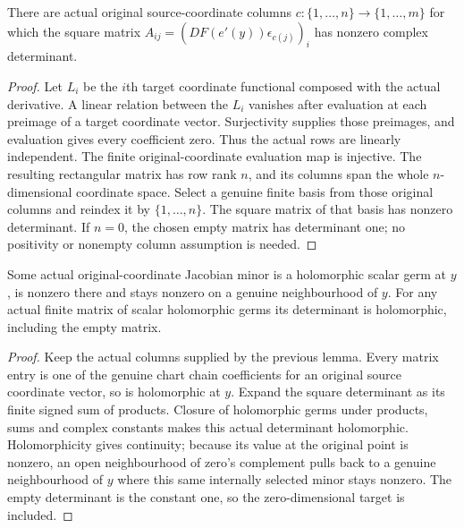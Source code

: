 \begin{lemma}\label{hir:submersion-jacobian-nonzero-minor}
There are actual original source-coordinate columns
$c:\{1,\ldots,n\}\to\{1,\ldots,m\}$ for which the square matrix
$A_{ij}=(DF(e'(y))\epsilon_{c(j)})_i$ has nonzero complex determinant.
\leanok
{}
\end{lemma}
\begin{proof}
Let $L_i$ be the $i$th target coordinate functional composed with the actual
derivative. A linear relation between the $L_i$ vanishes after evaluation at
each preimage of a target coordinate vector. Surjectivity supplies those
preimages, and evaluation gives every coefficient zero. Thus the actual rows
are linearly independent. The finite original-coordinate evaluation map is
injective. The resulting rectangular matrix has row rank $n$, and its columns
span the whole $n$-dimensional coordinate space. Select a genuine finite basis
from those original columns and reindex it by $\{1,\ldots,n\}$. The square
matrix of that basis has nonzero determinant. If $n=0$, the chosen empty matrix
has determinant one; no positivity or nonempty column assumption is needed.
\end{proof}

\begin{theorem}\label{hir:submersion-holomorphic-jacobian-pivot}
Some actual original-coordinate Jacobian minor is a holomorphic scalar germ
at $y$, is nonzero there and stays nonzero on a genuine neighbourhood of $y$.
For any actual finite matrix of scalar holomorphic germs its determinant is
holomorphic, including the empty matrix.
\leanok
{}
\end{theorem}
\begin{proof}
Keep the actual columns supplied by the previous lemma. Every matrix entry is
one of the genuine chart chain coefficients for an original source coordinate
vector, so is holomorphic at $y$. Expand the square determinant as its finite
signed sum of products. Closure of holomorphic germs under products, sums and
complex constants makes this actual determinant holomorphic. Holomorphicity
gives continuity; because its value at the original point is nonzero, an open
neighbourhood of zero's complement pulls back to a genuine neighbourhood of
$y$ where this same internally selected minor stays nonzero. The empty
determinant is the constant one, so the zero-dimensional target is included.
\end{proof}
